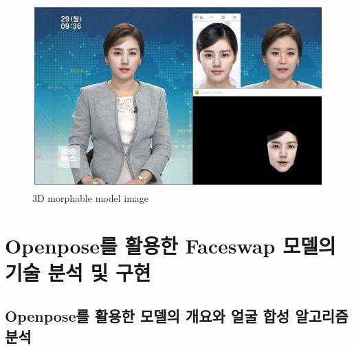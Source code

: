 \documentclass[chapter,oneside]{oblivoir}
\begin{document}
\begin{figure}[h!]
  \centering
    \includegraphics{pic/chp2/img747}
  \caption{ 3D morphable model image\cite{reference7}}
\end{figure}



\chapter{Openpose를 활용한 Faceswap 모델의 기술 분석 및 구현}

\section{Openpose를 활용한 모델의 개요와 얼굴 합성 알고리즘 분석}
\end{document}
